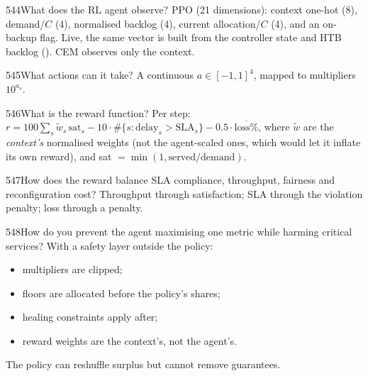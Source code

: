 \begin{qa}{544}{What does the RL agent observe?}
PPO (21 dimensions): context one-hot (8), demand/$C$ (4), normalised backlog (4), current allocation/$C$ (4), and an
on-backup flag. Live, the same vector is built from the controller state and HTB backlog ().
CEM observes only the context.
\end{qa}

\begin{qa}{545}{What actions can it take?}
A continuous $a\in[-1,1]^4$, mapped to multipliers $10^{a_s}$.
\end{qa}

\begin{qa}{546}{What is the reward function?}
Per step: $r=100\sum_s \tilde w_s\,\text{sat}_s-10\cdot\#\{s:\text{delay}_s>\text{SLA}_s\}-0.5\cdot\overline{\text{loss}\%}$,
where $\tilde w$ are the \emph{context's} normalised weights (not the agent-scaled ones, which would let it inflate its
own reward), and sat $=\min(1,\text{served}/\text{demand})$.
\end{qa}

\begin{qa}{547}{How does the reward balance SLA compliance, throughput, fairness and reconfiguration cost?}
Throughput through satisfaction; SLA through the violation penalty; loss through a penalty.
\end{qa}

\begin{qa}{548}{How do you prevent the agent maximising one metric while harming critical services?}
With a safety layer outside the policy:
\begin{itemize}
\item multipliers are clipped;
\item floors are allocated before the policy's shares;
\item healing constraints apply after;
\item reward weights are the context's, not the agent's.
\end{itemize}
The policy can reshuffle surplus but cannot remove guarantees.
\end{qa}

